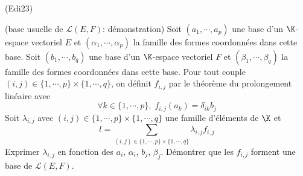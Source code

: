 \begin{tiny}(Edi23)\end{tiny} (base usuelle de $\mathcal{L}(E,F)$: démonstration)\newline
Soit $(a_1,\cdots,a_p)$ une base d'un $\K$-espace vectoriel $E$ et $(\alpha_1, \cdots, \alpha_p)$ la famille des formes coordonnées dans cette base. Soit $(b_1,\cdots,b_q)$ une base d'un $\K$-espace vectoriel $F$ et $(\beta_1, \cdots, \beta_q)$ la famille des formes coordonnées dans cette base.\newline
Pour tout couple $(i,j)\in \{1, \cdots, p\}\times \{1, \cdots, q\}$, on définit $f_{i,j}$ par le théorème du prolongement linéaire avec
\begin{displaymath}
 \forall k\in \{1, \cdots, p\},\; 
f_{i,j}(a_k)=\delta_{ik}b_j
\end{displaymath}
Soit $\lambda_{i,j}$ avec $(i,j)\in \{1, \cdots, p\}\times \{1, \cdots, q\}$ une famille d'éléments de $\K$ et 
\begin{displaymath}
 l=\sum_{(i,j)\in \{1, \cdots, p\}\times \{1, \cdots, q\}}\lambda_{i,j}f_{i,j}
\end{displaymath}
Exprimer $\lambda_{i,j}$ en fonction des $a_i$, $\alpha_i$, $b_j$, $\beta_j$. Démontrer que les $f_{i,j}$ forment une base de $\mathcal{L}(E,F)$.